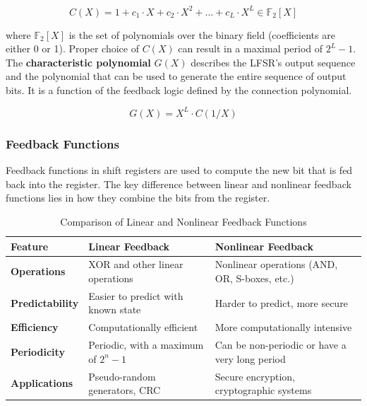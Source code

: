 \[ C(X) = 1 + c_1 \cdot X + c_2 \cdot X^2 + \dots + c_L \cdot X^L \in \mathbb{F}_2\left[X \right] \]

where $\mathbb{F}_2\left[X \right]$ is the set of polynomials over the binary field (coefficients are either 0 or 1). Proper choice of $C(X)$ can result in a maximal period of $2^L - 1$.\\

The \textbf{characteristic polynomial} $G(X)$ describes the LFSR's output sequence and the polynomial that can be used to generate the entire sequence of output bits. It is a function of the feedback logic defined by the connection polynomial.

\[ G(X) = X^L \cdot C(1/X) \]


\subsubsection{Feedback Functions}
Feedback functions in shift registers are used to compute the new bit that is fed back into the register. The key difference between linear and nonlinear feedback functions lies in how they combine the bits from the register.

\begin{table}[h!]
    \centering
    \renewcommand{\arraystretch}{1.2} %
    \begin{tabular}{|>{\raggedright\arraybackslash}m{4cm}|>{\raggedright\arraybackslash}m{5cm}|>{\raggedright\arraybackslash}m{5cm}|}
    \hline
    \textbf{Feature} & \textbf{Linear Feedback} & \textbf{Nonlinear Feedback} \\
    \hline
    \textbf{Operations} & XOR and other linear operations & Nonlinear operations (AND, OR, S-boxes, etc.) \\
    \hline
    \textbf{Predictability} & Easier to predict with known state & Harder to predict, more secure \\
    \hline
    \textbf{Efficiency} & Computationally efficient & More computationally intensive \\
    \hline
    \textbf{Periodicity} & Periodic, with a maximum of $2^n - 1$ & Can be non-periodic or have a very long period \\
    \hline
    \textbf{Applications} & Pseudo-random generators, CRC & Secure encryption, cryptographic systems \\
    \hline
    \end{tabular}
    \caption{Comparison of Linear and Nonlinear Feedback Functions}
    \label{tab:feedback_comparison}
\end{table}

